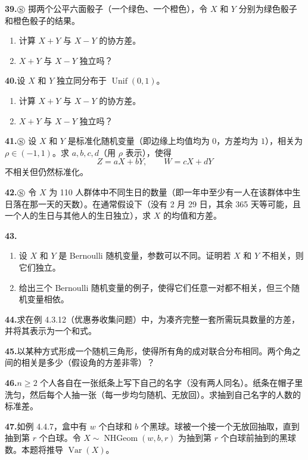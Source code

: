 \documentclass[UTF8, 12pt, fontset=fandol, oneside]{ctexart}
\begin{document}
\noindent\textbf{39.}\quad $\circledS$ 掷两个公平六面骰子（一个绿色、一个橙色），令 $X$ 和 $Y$ 分别为绿色骰子和橙色骰子的结果。
\begin{enumerate}
  \item[(a)] 计算 $X+Y$ 与 $X-Y$ 的协方差。
  \item[(b)] $X+Y$ 与 $X-Y$ 独立吗？
\end{enumerate}

\noindent\textbf{40.}\quad 设 $X$ 和 $Y$ 独立同分布于 $\operatorname{Unif}(0,1)$。
\begin{enumerate}
  \item[(a)] 计算 $X+Y$ 与 $X-Y$ 的协方差。
  \item[(b)] $X+Y$ 与 $X-Y$ 独立吗？
\end{enumerate}

\noindent\textbf{41.}\quad $\circledS$ 设 $X$ 和 $Y$ 是标准化随机变量（即边缘上均值均为 $0$，方差均为 $1$），相关为 $\rho\in(-1,1)$。求 $a,b,c,d$（用 $\rho$ 表示），使得
\[
  Z=aX+bY,\qquad W=cX+dY
\]
不相关但仍然标准化。

\noindent\textbf{42.}\quad $\circledS$ 令 $X$ 为 110 人群体中不同生日的数量（即一年中至少有一人在该群体中生日落在那一天的天数）。在通常假设下（没有 2 月 29 日，其余 365 天等可能，且一个人的生日与其他人的生日独立），求 $X$ 的均值和方差。

\noindent\textbf{43.}\quad
\begin{enumerate}
  \item[(a)] 设 $X$ 和 $Y$ 是 Bernoulli 随机变量，参数可以不同。证明若 $X$ 和 $Y$ 不相关，则它们独立。
  \item[(b)] 给出三个 Bernoulli 随机变量的例子，使得它们任意一对都不相关，但三个随机变量相依。
\end{enumerate}

\noindent\textbf{44.}\quad 求在例 4.3.12（优惠券收集问题）中，为凑齐完整一套所需玩具数量的方差，并将其表示为一个和式。

\noindent\textbf{45.}\quad 以某种方式形成一个随机三角形，使得所有角的成对联合分布相同。两个角之间的相关是多少（假设角的方差非零）？

\noindent\textbf{46.}\quad $n\ge 2$ 个人各自在一张纸条上写下自己的名字（没有两人同名）。纸条在帽子里洗匀，然后每个人抽一张（每一步均匀随机、无放回）。求抽到自己名字的人数的标准差。

\noindent\textbf{47.}\quad 如例 4.4.7，盒中有 $w$ 个白球和 $b$ 个黑球。球被一个接一个无放回抽取，直到抽到第 $r$ 个白球。令 $X\sim \operatorname{NHGeom}(w,b,r)$ 为抽到第 $r$ 个白球前抽到的黑球数。本题将推导 $\operatorname{Var}(X)$。
\end{document}
